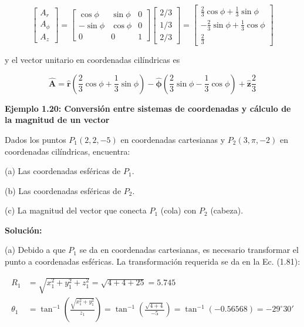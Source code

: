 \documentclass{book}
\begin{document}
\begin{equation*}
\begin{bmatrix} A_r \\ A_{\phi} \\ A_z \end{bmatrix} = 
\begin{bmatrix} 
\cos \phi & \sin \phi & 0 \\
-\sin \phi & \cos \phi & 0 \\
0 & 0 & 1 
\end{bmatrix}
\begin{bmatrix} 2/3 \\ 1/3 \\ 2/3 \end{bmatrix} = 
\begin{bmatrix} 
\frac{2}{3} \cos \phi + \frac{1}{3} \sin \phi \\
-\frac{2}{3} \sin \phi + \frac{1}{3} \cos \phi \\
\frac{2}{3}
\end{bmatrix}
\end{equation*}

y el vector unitario en coordenadas cilíndricas es

\begin{equation*}
\mathbf{\hat{A}} = \mathbf{\hat{r}} \left( \frac{2}{3} \cos \phi + \frac{1}{3} \sin \phi \right) - \mathbf{\hat{\phi}} \left( \frac{2}{3} \sin \phi - \frac{1}{3} \cos \phi \right) + \mathbf{\hat{z}} \frac{2}{3}
\end{equation*}

\textbf{Ejemplo 1.20: Conversión entre sistemas de coordenadas y cálculo de la magnitud de un vector}

Dados los puntos $P_1(2,2,-5)$ en coordenadas cartesianas y $P_2(3,\pi,-2)$ en coordenadas cilíndricas, encuentra:

(a) Las coordenadas esféricas de $P_1$.

(b) Las coordenadas esféricas de $P_2$.

(c) La magnitud del vector que conecta $P_1$ (cola) con $P_2$ (cabeza).

\textbf{Solución:}

(a) Debido a que $P_1$ se da en coordenadas cartesianas, es necesario transformar el punto a coordenadas esféricas. La transformación requerida se da en la Ec. (1.81):

\begin{align*}
R_1 &= \sqrt{x_1^2 + y_1^2 + z_1^2} = \sqrt{4 + 4 + 25} = 5.745 \\
\theta_1 &= \tan^{-1} \left( \frac{\sqrt{x_1^2 + y_1^2}}{z_1} \right) = \tan^{-1} \left( \frac{\sqrt{4 + 4}}{-5} \right) = \tan^{-1} (-0.56568) = -29^\circ 30'
\end{align*}
\end{document}
